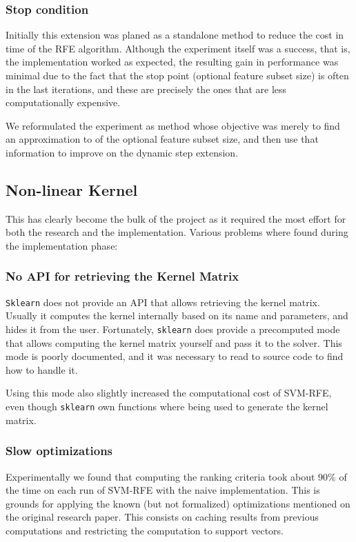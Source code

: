 \subsubsection*{Stop condition}

Initially this extension was planed as a standalone method to reduce the cost in time of the RFE algorithm. Although the experiment itself was a success, that is, the implementation worked as expected, the resulting gain in performance was minimal due to the fact that the stop point (optional feature subset size) is often in the last iterations, and these are precisely the ones that are less computationally expensive.

We reformulated the experiment as method whose objective was merely to find an approximation to of the optional feature subset size, and then use that in\-for\-ma\-tion to improve on the dynamic step extension.

\subsection*{Non-linear Kernel}

This has clearly become the bulk of the project as it required the most effort for both the research and the implementation. Various problems where found during the implementation phase:

\subsubsection*{No API for retrieving the Kernel Matrix}
\texttt{Sklearn} does not provide an API that allows retrieving the kernel matrix. Usually it computes the kernel internally based on its name and parameters, and hides it from the user. Fortunately, \texttt{sklearn} does provide a precomputed mode that allows computing the kernel matrix yourself and pass it to the solver. This mode is poorly documented, and it was necessary to read to source code to find how to handle it.

Using this mode also slightly increased the computational cost of SVM-RFE, even though \texttt{sklearn} own functions where being used to generate the kernel matrix.

\subsubsection*{Slow optimizations}
Experimentally we found that computing the ranking criteria took about 90\% of the time on each run of SVM-RFE with the naive implement\-ation. This is grounds for applying the known (but not formalized) optimizations mentioned on the original research paper. This consists on caching results from previous computations and restricting the comput\-ation to support vectors.

